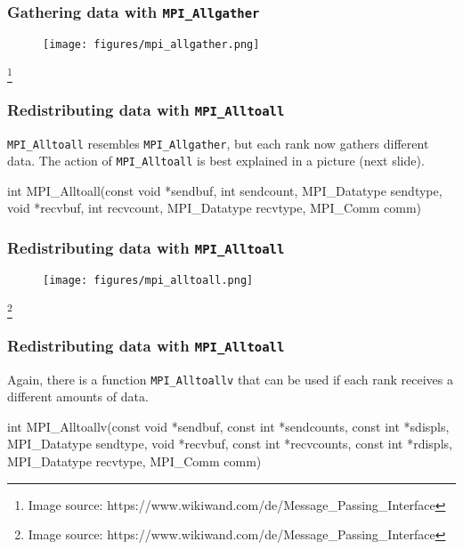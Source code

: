 \documentclass[12pt,t]{beamer}
\newcommand\blfootnote[1]{%
  \begingroup
  \renewcommand\thefootnote{}\footnote{\tiny #1}%
  \addtocounter{footnote}{-1}%
  \endgroup
}
\begin{document}
  \begin{frame}[fragile]
    \frametitle{Gathering data with \texttt{MPI\_Allgather}}

    \begin{figure}
      \centering
      \texttt{[image: figures/mpi\_allgather.png]}
    \end{figure}
    \blfootnote{Image source: https://www.wikiwand.com/de/Message\_Passing\_Interface}
  \end{frame}

  \begin{frame}[fragile]
    \frametitle{Redistributing data with \texttt{MPI\_Alltoall}}

    \texttt{MPI\_Alltoall} resembles \texttt{MPI\_Allgather}, but each rank now gathers different data.
    The action of \texttt{MPI\_Alltoall} is best explained in a picture (next slide).
    \begin{code}
int MPI_Alltoall(const void *sendbuf,
                 int sendcount,
                 MPI_Datatype sendtype,
                 void *recvbuf,
                 int recvcount,
                 MPI_Datatype recvtype,
                 MPI_Comm comm)
    \end{code}
  \end{frame}

  \begin{frame}[fragile]
    \frametitle{Redistributing data with \texttt{MPI\_Alltoall}}

    \begin{figure}
      \centering
      \texttt{[image: figures/mpi\_alltoall.png]}
    \end{figure}
    \blfootnote{Image source: https://www.wikiwand.com/de/Message\_Passing\_Interface}
  \end{frame}

  \begin{frame}[fragile]
    \frametitle{Redistributing data with \texttt{MPI\_Alltoall}}

    Again, there is a function \texttt{MPI\_Alltoallv} that can be used if each rank receives a different amounts of data.
    \begin{code}
int MPI_Alltoallv(const void *sendbuf,
                  const int *sendcounts,
                  const int *sdispls,
                  MPI_Datatype sendtype,
                  void *recvbuf,
                  const int *recvcounts,
                  const int *rdispls,
                  MPI_Datatype recvtype,
                  MPI_Comm comm)
    \end{code}
  \end{frame}
\end{document}
